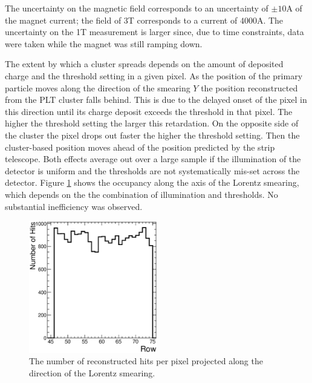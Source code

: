 \documentclass[journal]{IEEEtran}
\begin{document}
The uncertainty on the magnetic field corresponds to an uncertainty of $\pm 10$A of the magnet current; the field of 3T corresponds to a current of $4000$A.  The uncertainty on the 1T measurement is larger since, due to time constraints, data were taken while the magnet was still ramping down.


The extent by which a cluster spreads depends on the amount of 
deposited charge and the threshold setting in a given pixel. 
As the position of the primary particle moves along the direction 
of the smearing $Y$ the position reconstructed from the PLT cluster 
falls behind. This is due to the delayed onset of the pixel in this 
direction until its charge deposit exceeds the threshold in that pixel.
The higher the threshold setting the larger this retardation.
On the opposite side of the cluster the pixel drops out faster
the higher the threshold setting. Then the cluster-based position
moves ahead of the position predicted by the strip telescope.
Both effects average out over a large sample if the illumination of 
the detector is uniform and the thresholds are not systematically 
mis-set across the detector.  Figure \ref{fig:occupancy} shows the occupancy along the axis of the Lorentz smearing, which depends on the the combination of illumination and thresholds.  No substantial inefficiency was observed. 

\begin{figure}[!h]
\centering
\includegraphics[width=0.5\textwidth]{plt_row_occupancy}
\caption{ The number of reconstructed hits per pixel projected along the direction of the Lorentz smearing.}
\label{fig:occupancy}
\end{figure}
 
\end{document}
